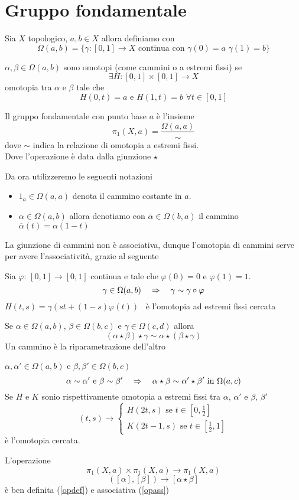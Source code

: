 \section{Gruppo fondamentale}
\begin{defn}Sia $X$ topologico, $a,b \in X$ allora definiamo con
$$ \Omega(a,b)=\{ \gamma :[0,1]\to X  \text{ continua con } \gamma(0)=a \, \, \gamma(1)=b\}$$
\end{defn}
\begin{defn}$\alpha, \beta \in \Omega(a,b)$ sono omotopi (come cammini o a estremi fissi) se $$ \exists H : [0,1] \times [0,1] \to X $$ omotopia tra $\alpha$ e $\beta$ tale che $$H(0,t)=a \text{ e } H(1,t)=b \, \,\forall t \in [0,1]$$
\end{defn}
\begin{defn}Il gruppo fondamentale con punto base $a$ \`e l'insieme $$\pi_1(X,a) = \frac{\Omega(a,a)}{\sim}$$
dove $\sim$ indica la relazione di omotopia a estremi fissi.\\
Dove l'operazione \`e data dalla giunzione $\star$
\end{defn}
\begin{oss}Da ora utilizzeremo le seguenti notazioni 
\begin{itemize}
\item   $1_a\in \Omega(a,a)$ denota il cammino costante in $a$.
\item $\alpha\in \Omega(a,b)$ allora denotiamo con $\overline{\alpha} \in \Omega(b,a)$ il cammino $\overline{\alpha}(t)=\alpha(1-t)$
\end{itemize}
\end{oss}
La giunzione di cammini non \`e associativa, dunque l'omotopia di cammini serve per avere l'associativit\`a, grazie al seguente
\begin{lem}Sia $\varphi:\, [0,1]\to [0,1]$ continua e tale che $\varphi(0)=0$ e $\varphi(1)=1$.\\
$$ \gamma\in \Omega(a,b) \quad \Rightarrow \quad \gamma \sim \gamma \circ \varphi$$
\proof $H(t,s)=\gamma(st + (1-s) \varphi(t))$ \
\`e l'omotopia ad estremi fissi cercata \endproof
\end{lem}
\begin{cor}\label{opass} Se $ \alpha\in \Omega(a,b)$, $\beta \in \Omega(b,c)$ e $ \gamma \in \Omega(c,d)$ allora 
$$ (\alpha\star \beta) \star \gamma \sim \alpha\star ( \beta \star \gamma)$$
\proof Un cammino \`e la riparametrazione dell'altro
\end{cor}
\begin{lem}\label{opdef}$\alpha, \alpha' \in \Omega	(a,b)$ e $\beta, \beta' \in \Omega(b,c)$
$$ \alpha\sim \alpha' 
\text{ e } \beta \sim 
\beta' \quad \Rightarrow \quad \alpha\star \beta \sim \alpha' \star \beta' \text{ in } \Omega (a,c)$$
\proof Se $H$ e $K$  sonio rispettivamente  omotopia  a estremi fissi tra $\alpha$, $\alpha'$ e $\beta$, $\beta'$
$$ (t,s) \to \begin{cases} H(2t,s) \text{ se }  t \in \left[ 0, \frac{1}{2} \right] \\
K(2t-1,s)  \text{ se } t \in \left[ \frac{1}{2},1 \right]
\end{cases}$$
\`e l'omotopia cercata. \endproof
\end{lem}
\begin{cor}L'operazione
$$ \pi_1(X,a) \times \pi_1(X,a) \to \pi_1(X,a)$$
$$ ( [\alpha], [\beta] ) \to [ \alpha\star \beta]$$
\`e ben definita  (\ref{opdef}) e associativa (\ref{opass})
\end{cor}

